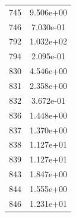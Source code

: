 \documentclass[12pt]{article}
\begin{document}
\begin{longtable}{@{}cc@{}}
745 & 9.506e+00 \\
746 & 7.030e-01 \\
792 & 1.032e+02 \\
794 & 2.095e-01 \\
830 & 4.546e+00 \\
831 & 2.358e+00 \\
832 & 3.672e-01 \\
836 & 1.448e+00 \\
837 & 1.370e+00 \\
838 & 1.127e+01 \\
839 & 1.127e+01 \\
843 & 1.847e+00 \\
844 & 1.555e+00 \\
846 & 1.231e+01 \\

\bottomrule
\end{longtable}
\end{document}
